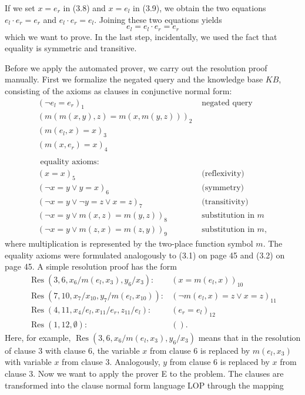 \documentclass[10pt]{book}
\begin{document}
If we set $x=e_{r}$ in (3.8) and $x=e_{l}$ in (3.9), we obtain the two equations $e_{l} \cdot e_{r}=e_{r}$ and $e_{l} \cdot e_{r}=e_{l}$. Joining these two equations yields
$$
e_{l}=e_{l} \cdot e_{r}=e_{r}
$$
which we want to prove. In the last step, incidentally, we used the fact that equality is symmetric and transitive.

Before we apply the automated prover, we carry out the resolution proof manually. First we formalize the negated query and the knowledge base $K B$, consisting of the axioms as clauses in conjunctive normal form:
$$
\begin{array}{ll}
\left(\neg e_{l}=e_{r}\right)_{1} & \text { negated query } \\
(m(m(x, y), z)=m(x, m(y, z)))_{2} & \\
\left(m\left(e_{l}, x\right)=x\right)_{3} & \\
\left(m\left(x, e_{r}\right)=x\right)_{4} & \\
& \\
\text { equality axioms: } & \\
(x=x)_{5} & \text { (reflexivity) } \\
(\neg x=y \vee y=x)_{6} & \text { (symmetry) } \\
(\neg x=y \vee \neg y=z \vee x=z)_{7} & \text { (transitivity) } \\
(\neg x=y \vee m(x, z)=m(y, z))_{8} & \text { substitution in } m \\
(\neg x=y \vee m(z, x)=m(z, y))_{9} & \text { substitution in } m,
\end{array}
$$
where multiplication is represented by the two-place function symbol $m$. The equality axioms were formulated analogously to (3.1) on page 45 and (3.2) on page 45. A simple resolution proof has the form
$$
\begin{array}{ll}
\operatorname{Res}\left(3,6, x_{6} / m\left(e_{l}, x_{3}\right), y_{6} / x_{3}\right): & \left(x=m\left(e_{l}, x\right)\right)_{10} \\
\operatorname{Res}\left(7,10, x_{7} / x_{10}, y_{7} / m\left(e_{l}, x_{10}\right)\right): & \left(\neg m\left(e_{l}, x\right)=z \vee x=z\right)_{11} \\
\operatorname{Res}\left(4,11, x_{4} / e_{l}, x_{11} / e_{r}, z_{11} / e_{l}\right): & \left(e_{r}=e_{l}\right)_{12} \\
\operatorname{Res}(1,12, \emptyset): & () .
\end{array}
$$
Here, for example, $\operatorname{Res}\left(3,6, x_{6} / m\left(e_{l}, x_{3}\right), y_{6} / x_{3}\right)$ means that in the resolution of clause 3 with clause 6, the variable $x$ from clause 6 is replaced by $m\left(e_{l}, x_{3}\right)$ with variable $x$ from clause 3. Analogously, $y$ from clause 6 is replaced by $x$ from clause 3.
Now we want to apply the prover E to the problem. The clauses are transformed into the clause normal form language LOP through the mapping
\end{document}

